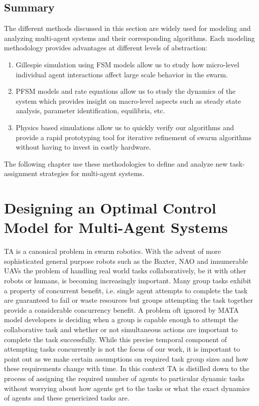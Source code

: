 \documentclass[12pt]{book}
\begin{document}
\section{Summary}
The different methods discussed in this section are widely used for modeling and analyzing multi-agent systems and their corresponding algorithms. Each modeling methodology provides advantages at different levels of abstraction:
\begin{enumerate}
	\item Gillespie simulation using FSM models allow us to study how micro-level individual agent interactions affect large scale behavior in the swarm.
	\item PFSM models and rate equations allow us to study the dynamics of the system which provides insight on macro-level aspects such as steady state analysis, parameter identification, equilibria, etc.
	\item Physics based simulations allow us to quickly verify our algorithms and provide a rapid prototyping tool for iterative refinement of swarm algorithms without having to invest in costly hardware.
\end{enumerate}
The following chapter use these methodologies to define and analyze new task-assignment strategies for multi-agent systems.

\chapter{Designing an Optimal Control Model for Multi-Agent Systems}\label{ch:model}
TA is a canonical problem in swarm robotics. With the advent of more sophisticated general purpose robots such as the Baxter, NAO and innumerable UAVs the problem of handling real world tasks collaboratively, be it with other robots or humans, is becoming increasingly important. Many group tasks exhibit a property of concurrent benefit, i.e. single agent attempts to complete the task are guaranteed to fail or waste resources but groups attempting the task together provide a considerable concurrency benefit. A problem oft ignored by MATA model developers is deciding when a group is capable enough to attempt the collaborative task and whether or not simultaneous actions are important to complete the task successfully. While this precise temporal component of attempting tasks concurrently is not the focus of our work, it is important to point out as we make certain assumptions on required task group sizes and how these requirements change with time. In this context TA is distilled down to the process of assigning the required number of agents to particular dynamic tasks without worrying about how agents get to the tasks or what the exact dynamics of agents and these genericized tasks are. 
\end{document}
